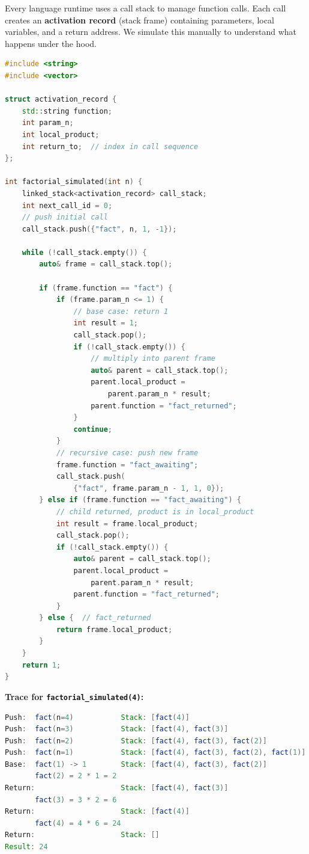 Every language runtime uses a call stack to manage function calls. Each call creates an \textbf{activation record} (stack frame) containing parameters, local variables, and a return address. We simulate this manually to understand what happens under the hood.

\begin{lstlisting}[language=C++]
#include <string>
#include <vector>

struct activation_record {
    std::string function;
    int param_n;
    int local_product;
    int return_to;  // index in call sequence
};

int factorial_simulated(int n) {
    linked_stack<activation_record> call_stack;
    int next_call_id = 0;
    // push initial call
    call_stack.push({"fact", n, 1, -1});

    while (!call_stack.empty()) {
        auto& frame = call_stack.top();

        if (frame.function == "fact") {
            if (frame.param_n <= 1) {
                // base case: return 1
                int result = 1;
                call_stack.pop();
                if (!call_stack.empty()) {
                    // multiply into parent frame
                    auto& parent = call_stack.top();
                    parent.local_product =
                        parent.param_n * result;
                    parent.function = "fact_returned";
                }
                continue;
            }
            // recursive case: push new frame
            frame.function = "fact_awaiting";
            call_stack.push(
                {"fact", frame.param_n - 1, 1, 0});
        } else if (frame.function == "fact_awaiting") {
            // child returned, product is in local_product
            int result = frame.local_product;
            call_stack.pop();
            if (!call_stack.empty()) {
                auto& parent = call_stack.top();
                parent.local_product =
                    parent.param_n * result;
                parent.function = "fact_returned";
            }
        } else {  // fact_returned
            return frame.local_product;
        }
    }
    return 1;
}
\end{lstlisting}

\textbf{Trace for \texttt{factorial\_simulated(4)}:}

\begin{lstlisting}[language=Java]
Push:  fact(n=4)           Stack: [fact(4)]
Push:  fact(n=3)           Stack: [fact(4), fact(3)]
Push:  fact(n=2)           Stack: [fact(4), fact(3), fact(2)]
Push:  fact(n=1)           Stack: [fact(4), fact(3), fact(2), fact(1)]
Base:  fact(1) -> 1        Stack: [fact(4), fact(3), fact(2)]
       fact(2) = 2 * 1 = 2
Return:                    Stack: [fact(4), fact(3)]
       fact(3) = 3 * 2 = 6
Return:                    Stack: [fact(4)]
       fact(4) = 4 * 6 = 24
Return:                    Stack: []
Result: 24
\end{lstlisting}

